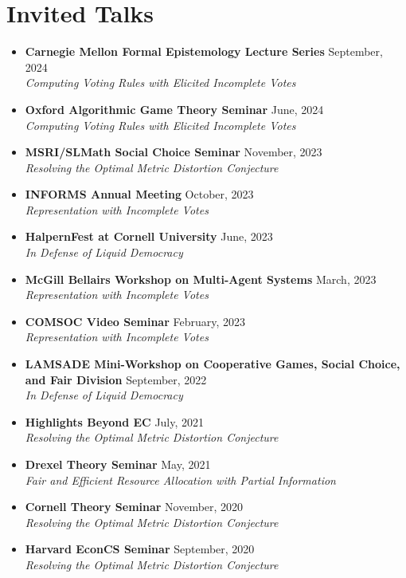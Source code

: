 \documentclass{article}
\begin{document}
\section{Invited Talks}
\begin{itemize}
    \setlength\itemsep{0.2em} %
    \item \textbf{Carnegie Mellon Formal Epistemology Lecture Series} \hfill September, 2024 \\
          \textit{Computing Voting Rules with Elicited Incomplete Votes}
    \item \textbf{Oxford Algorithmic Game Theory Seminar} \hfill June, 2024 \\
          \textit{Computing Voting Rules with Elicited Incomplete Votes}
    \item \textbf{MSRI/SLMath Social Choice Seminar} \hfill November, 2023 \\
          \textit{Resolving the Optimal Metric Distortion Conjecture}
    \item \textbf{INFORMS Annual Meeting} \hfill October, 2023 \\
          \textit{Representation with Incomplete Votes}
    \item \textbf{HalpernFest at Cornell University} \hfill June, 2023 \\
          \textit{In Defense of Liquid Democracy}
    \item \textbf{McGill Bellairs Workshop on Multi-Agent Systems} \hfill March, 2023 \\
          \textit{Representation with Incomplete Votes}
    \item \textbf{COMSOC Video Seminar} \hfill February, 2023 \\
          \textit{Representation with Incomplete Votes}
    \item \textbf{LAMSADE Mini-Workshop on Cooperative Games, Social Choice, and Fair Division} \hfill September, 2022 \\
          \textit{In Defense of Liquid Democracy}
    \item \textbf{Highlights Beyond EC} \hfill July, 2021 \\
          \textit{Resolving the Optimal Metric Distortion Conjecture}
    \item \textbf{Drexel Theory Seminar} \hfill May, 2021 \\
          \textit{Fair and Efficient Resource Allocation with Partial Information}
    \item \textbf{Cornell Theory Seminar} \hfill November, 2020 \\
          \textit{Resolving the Optimal Metric Distortion Conjecture}
    \item \textbf{Harvard EconCS Seminar} \hfill September, 2020 \\
          \textit{Resolving the Optimal Metric Distortion Conjecture}
\end{itemize}
\end{document}
